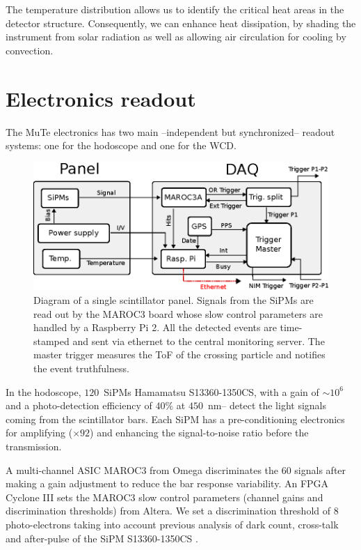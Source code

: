 \documentclass[letterpaper,11pt]{article}
\begin{document}
The temperature distribution allows us to identify the critical heat areas in the detector structure. Consequently, we can enhance heat dissipation, by shading the instrument from solar radiation as well as allowing air circulation for cooling by convection. 

\section{Electronics readout}
\label{daq}
The MuTe electronics has two main --independent but synchronized-- readout systems: one for the hodoscope and one for the WCD. 

\begin{figure}[htb]
\centering
\includegraphics[width=0.8\columnwidth]{Figures/DAQ.eps}
\caption{Diagram of a single scintillator panel. Signals from the SiPMs are read out by the MAROC3 board whose slow control parameters are handled by a Raspberry Pi 2. All the detected events are time-stamped and sent via ethernet to the central monitoring server. The master trigger measures the ToF of the crossing particle and notifies the event truthfulness.}
  \label{fig:scintillatordetector1}
\end{figure}

In the hodoscope, $120$~SiPMs Hamamatsu S13360-1350CS, with a gain of $\sim 10^6$ and a photo-detection efficiency of $40\%$ at $450$~nm-- detect the light signals coming from the scintillator bars. Each SiPM has a pre-conditioning electronics for amplifying ($\times 92$) and enhancing the signal-to-noise ratio before the transmission. 

A multi-channel ASIC MAROC3 from Omega discriminates the $60$ 
signals after making a gain adjustment to reduce the bar response variability. An FPGA Cyclone III sets the MAROC3 slow control parameters (channel gains and discrimination thresholds) from Altera. We set a discrimination threshold of $8$ photo-electrons taking into account previous analysis of dark count, cross-talk and after-pulse of the SiPM S13360-1350CS \cite{Villafrades2020}.
\end{document}
